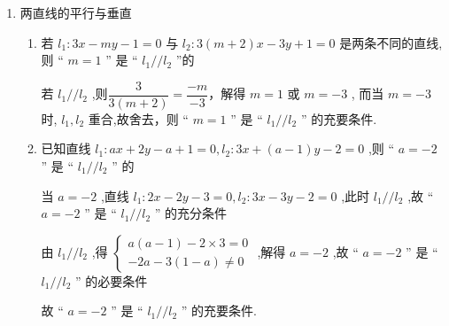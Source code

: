 \begin{enumerate}
\begin{enumerate}
        \item 已知直线 $y = \left( {3 - {2k}}\right) x - 6$ 不经过第一象限,则 $k$ 的取值范围为.
        \begin{jieda}
            由题意知,需满足它在 $y$ 轴上的截距不大于零,且斜率不大于零,则 $\left\{  \begin{array}{l}  - 6 \leq  0, \\  3 - {2k} \leq  0, \end{array}\right.$ 得 $k \geq  \dfrac{3}{2}$ .
        \end{jieda}
    \end{enumerate}
    \item 两直线的平行与垂直
    \begin{enumerate}
        \item 若 ${l}_{1} : {3x} - {my} - 1 = 0$ 与 ${l}_{2} : {3\left( {m + 2}\right) }x - {3y} + 1 = 0$ 是两条不同的直线,则 “ $m = 1$ ” 是 “ ${l}_{1}//{l}_{2}$ ”的
        \begin{jieda}
            若 ${l}_{1}//{l}_{2}$ ,则$\dfrac{3}{3(m+2)} = \dfrac{-m}{-3}$，解得 $m = 1$ 或 $m =  - 3$ ,
            而当 $m =  - 3$ 时, ${l}_{1},{l}_{2}$ 重合,故舍去，则 “ $m = 1$ ” 是 “ ${l}_{1}//{l}_{2}$ ” 的充要条件.
        \end{jieda} 

        \item 已知直线 ${l}_{1} : {ax} + {2y} - a + 1 = 0,{l}_{2} : {3x} + \left( {a - 1}\right) y - 2 = 0$ ,则 “ $a =  - 2$ ” 是 “ ${l}_{1}//{l}_{2}$ ” 的
        \begin{jieda}
            当 $a =  - 2$ ,直线 ${l}_{1} : {2x} - {2y} - 3 = 0,{l}_{2} : {3x} - {3y} - 2 = 0$ ,此时 ${l}_{1}//{l}_{2}$ ,故 “ $a =  - 2$ ” 是 “ ${l}_{1}//{l}_{2}$ ” 的充分条件

            由 ${l}_{1}//{l}_{2}$ ,得 $\left\{  \begin{array}{l} a\left( {a - 1}\right)  - 2 \times  3 = 0 \\   - {2a} - 3\left( {1 - a}\right)  \neq  0 \end{array}\right.$ ,解得 $a =  - 2$ ,故 “ $a =  - 2$ ” 是 “ ${l}_{1}//{l}_{2}$ ” 的必要条件

            故 “ $a =  - 2$ ” 是 “ ${l}_{1}//{l}_{2}$ ” 的充要条件.
        \end{jieda}
        

\end{enumerate}
\end{enumerate}

